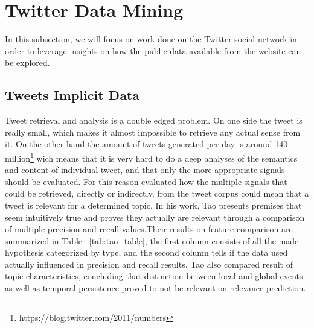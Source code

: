 \section{Twitter Data Mining} 
\label{sec:data_mining_in_twitter_}
In this subsection, we will focus on work done on the Twitter social network in order to leverage insights on how the public data available from the website can be explored. 

\subsection{Tweets Implicit Data} 
\label{sub:the_tweet}
Tweet retrieval and analysis is a double edged problem. On one side the tweet is really small, which makes it almost impossible to retrieve any actual sense from it. On the other hand the amount of tweets generated per day is around 140 million\footnote{https://blog.twitter.com/2011/numbers} wich means that it is very hard to do a deep analyses of the semantics and content of individual tweet, and that only the more appropriate signals should be evaluated.
For this reason \citet{Tao2012} evaluated how the multiple signals that could be retrieved, directly or indirectly, from the tweet corpus could mean that a tweet is relevant for a determined topic. In his work, Tao presents premises that seem intuitively true and proves they actually are relevant through a comparison of multiple precision and recall values.Their results on feature comparison are summarized in Table ~\ref{tab:tao_table}, the first column consists of all the made hypothesis categorized by type, and the second column tells if the data used actually influenced in precision and recall results. Tao also compared result of topic characteristics, concluding that distinction between local and global events as well as temporal persistence proved to not be relevant on relevance prediction.

